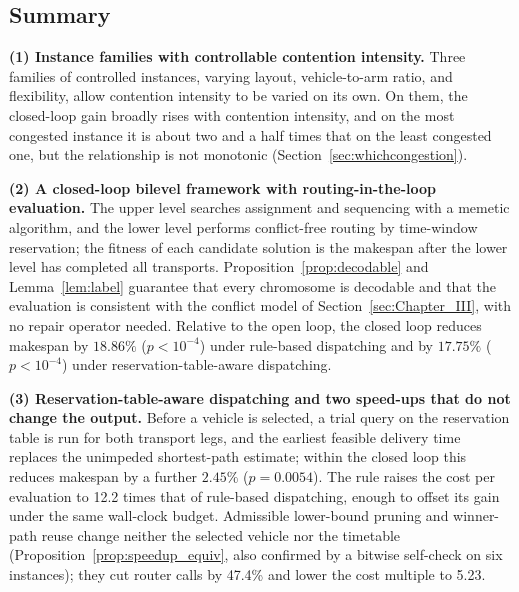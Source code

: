 \documentclass[manuscript,screen,review]{acmart}
\newcommand{\GainLoopRule}{18.86\%}      %
\newcommand{\PLoopRule}{<10^{-4}}
\newcommand{\GainLoopProbe}{17.75\%}     %
\newcommand{\PLoopProbe}{<10^{-4}}
\newcommand{\GainProbeLoop}{2.45\%}      %
\newcommand{\PProbeLoop}{=0.0054}
\newcommand{\RouteCallCut}{47.4\%}
\newcommand{\CostMultBefore}{12.2}
\newcommand{\CostMultAfter}{5.23}
\begin{document}
\subsection{Summary}
\label{sec:contributions}

\textbf{(1) Instance families with controllable contention intensity.}
Three families of controlled instances, varying layout, vehicle-to-arm ratio, and flexibility, allow contention intensity to be varied on its own. On them, the closed-loop gain broadly rises with contention intensity, and on the most congested instance it is about two and a half times that on the least congested one, but the relationship is not monotonic (Section~\ref{sec:whichcongestion}).

\textbf{(2) A closed-loop bilevel framework with routing-in-the-loop evaluation.}
The upper level searches assignment and sequencing with a memetic algorithm, and the lower level performs conflict-free routing by time-window reservation; the fitness of each candidate solution is the makespan after the lower level has completed all transports.
Proposition~\ref{prop:decodable} and Lemma~\ref{lem:label} guarantee that every chromosome is decodable and that the evaluation is consistent with the conflict model of Section~\ref{sec:Chapter_III}, with no repair operator needed.
Relative to the open loop, the closed loop reduces makespan by $\GainLoopRule$ ($p\PLoopRule$) under rule-based dispatching and by $\GainLoopProbe$ ($p\PLoopProbe$) under reservation-table-aware dispatching.

\textbf{(3) Reservation-table-aware dispatching and two speed-ups that do not change the output.}
Before a vehicle is selected, a trial query on the reservation table is run for both transport legs, and the earliest feasible delivery time replaces the unimpeded shortest-path estimate; within the closed loop this reduces makespan by a further $\GainProbeLoop$ ($p\PProbeLoop$).
The rule raises the cost per evaluation to \CostMultBefore{} times that of rule-based dispatching, enough to offset its gain under the same wall-clock budget. Admissible lower-bound pruning and winner-path reuse change neither the selected vehicle nor the timetable (Proposition~\ref{prop:speedup_equiv}, also confirmed by a bitwise self-check on six instances); they cut router calls by \RouteCallCut{} and lower the cost multiple to \CostMultAfter{}.
\end{document}

